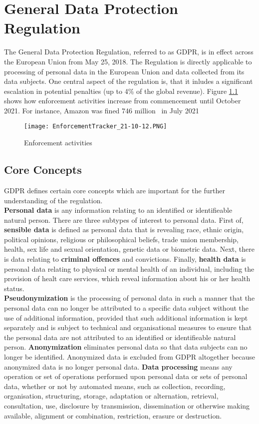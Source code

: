 \documentclass[a4paper,12pt]{report}
\begin{document}
	\chapter{General Data Protection Regulation}
	The General Data Protection Regulation, referred to as GDPR, is in effect across the European Union from May 25, 2018.
	The Regulation is directly applicable to processing of personal data in the European Union and data collected from its data subjects.
	One central aspect of the regulation is, that it inludes a significant escalation in potential penalties (up to 4\% of the global revenue).
	Figure \ref{fig:enforcement_tracker} shows how enforcement activities increase from commencement until October 2021.
	For instance, Amazon was fined 746 million \texteuro \ in July 2021 \cite{EnforcementTracker}
	\begin{figure}
		\texttt{[image: EnforcementTracker\_21-10-12.PNG]}
		\caption{Enforcement activities \cite{EnforcementTracker}}
		\label{fig:enforcement_tracker}
	\end{figure}
	
	\section{Core Concepts}
	\startsection
	GDPR defines certain core concepts which are important for the further understanding of the regulation.\\
	\textbf{Personal data} is any information relating to an identified or identifieable natural person.
	There are three subtypes of interest to personal data. 
	First of, \textbf{sensible data} is defined as personal data that is revealing race, ethnic origin, political opinions, religious or philosophical beliefs, trade union membership, health, sex life and sexual orientation, genetic data or biometric data.
	Next, there is data relating to \textbf{criminal offences} and convictions.
	Finally, \textbf{health data} is personal data relating to physical or mental health of an individual, including the provision of healt care services, which reveal information about his or her health status.\\
	\textbf{Pseudonymization} is the processing of personal data in such a manner that the personal data can no longer be attributed to a specific data subject without the use of additional information, provided that such additional information is kept separately and is subject to technical and organisational measures to ensure that the personal data are not attributed to an identified or identifieable natural person.
	\textbf{Anonymization} eliminates personal data so that data subjects can no longer be identified. 
	Anonymized data is excluded from GDPR altogether because anonymized data is no longer personal data.
	\textbf{Data processing} means any operation or set of operations performed upon personal data or sets of personal data, whether or not by automated means, such as collection, recording, organisation, structuring, storage, adaptation or alternation, retrieval, consultation, use, disclosure by transmission, dissemination or otherwise making available, alignment or combination, restriction, erasure or destruction.
	\closesection
\end{document}
